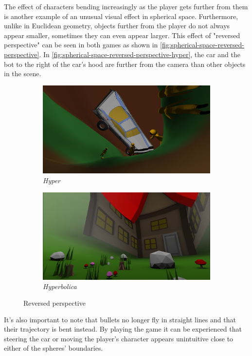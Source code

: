 The effect of characters bending increasingly as the player gets further from them is another example of an unusual visual effect in spherical space.
Furthermore, unlike in Euclidean geometry, objects further from the player do not always appear smaller, sometimes they can even appear larger.
This effect of "reversed perspective" can be seen in both games as shown in \autoref{fig:spherical-space-reversed-perspective}.
In \autoref{fig:spherical-space-reversed-perspective-hyper}, the car and the bot to the right of the car's hood are further from the camera than other objects in the scene.
\begin{figure}[!htb]
    \centering
    \begin{subfigure}[b]{0.475\textwidth}
        \centering
        \includegraphics[width=\textwidth]{chapters/results/sections/non_euclidean/resources/spherical-car.png}
        \caption[]%
        {{\small \textit{Hyper}}}
        \label{fig:spherical-space-reversed-perspective-hyper}
    \end{subfigure}
    \hfill
    \begin{subfigure}[b]{0.5\textwidth}
        \centering
        \includegraphics[width=\textwidth]{chapters/results/sections/non_euclidean/resources/hyperbolica-2.png}
        \caption[]%
        {{\small \textit{Hyperbolica}}}
        \label{fig:spherical-space-reversed-perspective-hyperbolica}
    \end{subfigure}
    \caption[]
    {\small Reversed perspective}
    \label{fig:spherical-space-reversed-perspective}
\end{figure}
It's also important to note that bullets no longer fly in straight lines and that their trajectory is bent instead.
By playing the game it can be experienced that steering the car or moving the player's character appears unintuitive close to either of the spheres' boundaries.